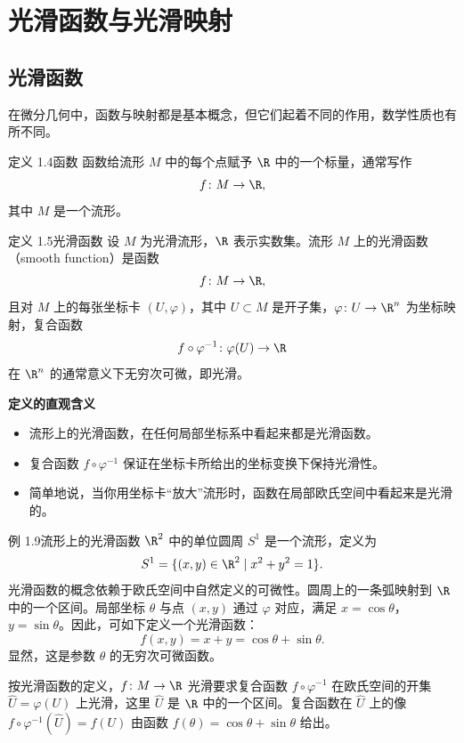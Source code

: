 \section{光滑函数与光滑映射}
\subsection{光滑函数}
在微分几何中，函数与映射都是基本概念，但它们起着不同的作用，数学性质也有所不同。

\begin{statement}{定义 1.4}{函数}
函数给流形 $M$ 中的每个点赋予 $\R$ 中的一个标量，通常写作
\[
  f\colon M\to\R,
\]
其中 $M$ 是一个流形。
\end{statement}

\begin{statement}{定义 1.5}{光滑函数}
设 $M$ 为光滑流形，$\R$ 表示实数集。流形 $M$ 上的光滑函数（smooth function）是函数
\[
  f\colon M\to\R,
\]
且对 $M$ 上的每张坐标卡 $(U,\varphi)$，其中 $U\subset M$ 是开子集，$\varphi\colon U\to\R^n$ 为坐标映射，复合函数
\[
  f\circ\varphi^{-1}\colon\varphi(U)\to\R
\]
在 $\R^n$ 的通常意义下无穷次可微，即光滑。

\textbf{定义的直观含义}
\begin{itemize}
  \item 流形上的光滑函数，在任何局部坐标系中看起来都是光滑函数。
  \item 复合函数 $f\circ\varphi^{-1}$ 保证在坐标卡所给出的坐标变换下保持光滑性。
  \item 简单地说，当你用坐标卡“放大”流形时，函数在局部欧氏空间中看起来是光滑的。
\end{itemize}
\end{statement}

\begin{statement}{例 1.9}{流形上的光滑函数}
$\R^2$ 中的单位圆周 $S^1$ 是一个流形，定义为
\[
  S^1=\{(x,y)\in\R^2\mid x^2+y^2=1\}.
\]
光滑函数的概念依赖于欧氏空间中自然定义的可微性。圆周上的一条弧映射到 $\R$ 中的一个区间。局部坐标 $\theta$ 与点 $(x,y)$ 通过 $\varphi$ 对应，满足 $x=\cos\theta$，$y=\sin\theta$。因此，可如下定义一个光滑函数：
\[
  f(x,y)=x+y=\cos\theta+\sin\theta.
\]
显然，这是参数 $\theta$ 的无穷次可微函数。

按光滑函数的定义，$f\colon M\to\R$ 光滑要求复合函数 $f\circ\varphi^{-1}$ 在欧氏空间的开集 $\widehat U=\varphi(U)$ 上光滑，这里 $\widehat U$ 是
$\R$ 中的一个区间。复合函数在 $\widehat U$ 上的像 $f\circ\varphi^{-1}(\widehat U)=f(U)$ 由函数 $f(\theta)=\cos\theta+\sin\theta$ 给出。
\end{statement}

